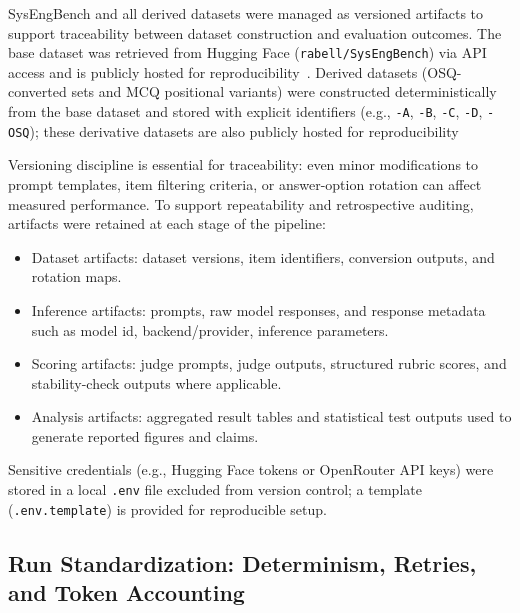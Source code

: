 SysEngBench and all derived datasets were managed as versioned artifacts to support traceability between dataset construction and evaluation outcomes. The base dataset was retrieved from Hugging Face (\texttt{rabell/SysEngBench}) via API access and is publicly hosted for reproducibility~\cite{bell_RabellSysEngBenchDatasets_2024}. Derived datasets (OSQ-converted sets and MCQ positional variants) were constructed deterministically from the base dataset and stored with explicit identifiers (e.g., \texttt{-A}, \texttt{-B}, \texttt{-C}, \texttt{-D}, \texttt{-OSQ}); these derivative datasets are also publicly hosted for reproducibility \cite{bell_RabellSysEngBenchADatasets_2025, bell_RabellSysEngBenchBDatasets_2025, bell_RabellSysEngBenchCDatasets_2025, bell_RabellSysEngBenchDDatasets_2025, bell_RabellSysEngBenchOSQ_2026}


Versioning discipline is essential for traceability: even minor modifications to prompt templates, item filtering criteria, or answer-option rotation can affect measured performance. To support repeatability and retrospective auditing, artifacts were retained at each stage of the pipeline:
\begin{itemize}
    \item Dataset artifacts: dataset versions, item identifiers, conversion outputs, and rotation maps.
    \item Inference artifacts: prompts, raw model responses, and response metadata such as model id, backend/provider, inference parameters.
    \item Scoring artifacts: judge prompts, judge outputs, structured rubric scores, and stability-check outputs where applicable.
    \item Analysis artifacts: aggregated result tables and statistical test outputs used to generate reported figures and claims.
\end{itemize}

Sensitive credentials (e.g., Hugging Face tokens or OpenRouter API keys) were stored in a local \texttt{.env} file excluded from version control; a template (\texttt{.env.template}) is provided for reproducible setup.


\subsection{Run Standardization: Determinism, Retries, and Token Accounting}
\label{subsec:ch3_run_controls}

